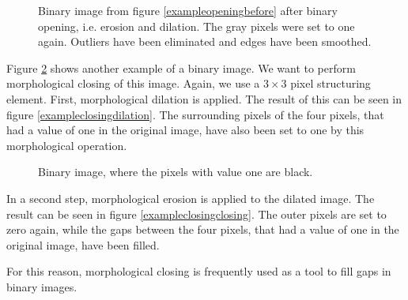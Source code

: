 \documentclass[a4paper,12pt]{article}
\theoremstyle{plain}
\theoremstyle{definition}
\begin{document}
\begin{figure}[h!]
	\centering
	\caption{Binary image from figure \ref{exampleopeningbefore} after binary opening, i.e. erosion and dilation. The gray pixels were set to one again. Outliers have been eliminated and edges have been smoothed.}
	\label{exampleopeningopening}
\end{figure}


Figure \ref{exampleclosingbefore} shows another example of a binary image. We want to perform morphological closing of this image. Again, we use a $3 \times 3$ pixel structuring element. First, morphological dilation is applied. The result of this can be seen in figure \ref{exampleclosingdilation}. The surrounding pixels of the four pixels, that had a value of one in the original image, have also been set to one by this morphological operation.

\begin{figure}[h]
	\centering
	\caption{Binary image, where the pixels with value one are black.}
	\label{exampleclosingbefore}
\end{figure}

In a second step, morphological erosion is applied to the dilated image. The result can be seen in figure \ref{exampleclosingclosing}. The outer pixels are set to zero again, while the gaps between the four pixels, that had a value of one in the original image, have been filled.

For this reason, morphological closing is frequently used as a tool to fill gaps in binary images.
\end{document}
